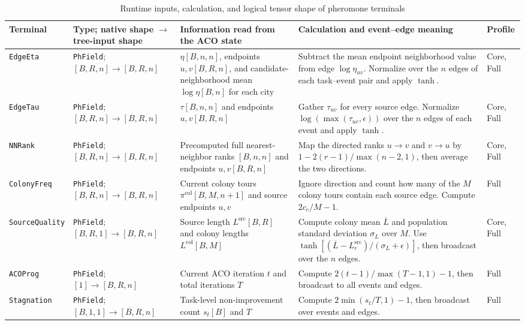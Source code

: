 \documentclass[letterpaper,journal]{IEEEtran}
\begin{document}
\begin{table}[t]
\caption{Runtime inputs, calculation, and logical tensor shape of pheromone terminals}
\label{tab:pheromone-terminals}
\centering
\scriptsize
\renewcommand{\arraystretch}{1.18}
\setlength{\tabcolsep}{2.5pt}
\begin{tabular}{L{20mm}L{31mm}L{49mm}L{58mm}L{14mm}}
\toprule
Terminal & Type; native shape \(\to\) tree-input shape &
Information read from the ACO state & Calculation and event--edge meaning &
Profile\\
\midrule
\texttt{EdgeEta} &
\texttt{PhField};
\([B,R,n]\to[B,R,n]\) &
\(\eta[B,n,n]\), endpoints \(u,v[B,R,n]\), and candidate-neighborhood mean
\(\log\eta[B,n]\) for each city &
Subtract the mean endpoint neighborhood value from edge \(\log\eta_{uv}\).
Normalize over the \(n\) edges of each task--event pair and apply \(\tanh\). &
Core, Full\\
\texttt{EdgeTau} &
\texttt{PhField};
\([B,R,n]\to[B,R,n]\) &
\(\tau[B,n,n]\) and endpoints \(u,v[B,R,n]\) &
Gather \(\tau_{uv}\) for every source edge.
Normalize \(\log(\max(\tau_{uv},\epsilon))\) over the \(n\) edges of each event
and apply \(\tanh\). &
Core, Full\\
\texttt{NNRank} &
\texttt{PhField};
\([B,R,n]\to[B,R,n]\) &
Precomputed full nearest-neighbor ranks \([B,n,n]\) and endpoints
\(u,v[B,R,n]\) &
Map the directed ranks \(u\!\to\!v\) and \(v\!\to\!u\) by
\(1-2(r-1)/\max(n-2,1)\), then average the two directions. &
Core, Full\\
\texttt{ColonyFreq} &
\texttt{PhField};
\([B,R,n]\to[B,R,n]\) &
Current colony tours \(\pi^{\mathrm{col}}[B,M,n+1]\) and source endpoints
\(u,v\) &
Ignore direction and count how many of the \(M\) colony tours contain each
source edge.
Compute \(2c_e/M-1\). &
Full\\
\texttt{SourceQuality} &
\texttt{PhField};
\([B,R,1]\to[B,R,n]\) &
Source length \(L^{\mathrm{src}}[B,R]\) and colony lengths
\(L^{\mathrm{col}}[B,M]\) &
Compute colony mean \(\overline L\) and population standard deviation
\(\sigma_L\) over \(M\).
Use \(\tanh[(\overline L-L^{\mathrm{src}}_r)/(\sigma_L+\epsilon)]\), then
broadcast over the \(n\) edges. &
Core, Full\\
\texttt{ACOProg} &
\texttt{PhField};
\([1]\to[B,R,n]\) &
Current ACO iteration \(t\) and total iterations \(T\) &
Compute \(2(t-1)/\max(T-1,1)-1\), then broadcast to all events and edges. &
Full\\
\texttt{Stagnation} &
\texttt{PhField};
\([B,1,1]\to[B,R,n]\) &
Task-level non-improvement count \(s_t[B]\) and \(T\) &
Compute \(2\min(s_t/T,1)-1\), then broadcast over events and edges. &
Full\\
\bottomrule
\end{tabular}
\end{table}
\end{document}
